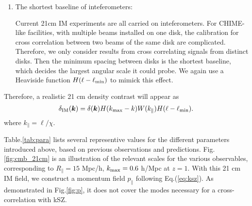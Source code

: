 \begin{enumerate}
\item The shortest baseline of inteferometers:

Current 21cm IM experiments are all carried on inteferometers. 
For CHIME-like facilities, with multiple beams installed on one disk, 
the calibration for cross correlation between two beams of the same disk 
are complicated. 
Therefore, we only consider results from cross correlating signals from distinct disks. 
Then the minimum spacing between disks is the shortest baseline, which decides the largest angular scale it could probe.  We again use a Heaviside function 
$H(\ell-\ell_\mathrm{min})$ to mimick this effect. 
\end{enumerate}
Therefore, a realistic 21 cm density contrast will appear as 
\begin{eqnarray}
\label{eq:ns}
    \delta_\mathrm{IM}(\bm{k})=\delta(\bm{k})H(k_\mathrm{max}-k)W(k_\parallel)H(\ell-\ell_\mathrm{min}).
\end{eqnarray}
where $k_\parallel = \ell / \chi$. 

Table.\ref{tab:para} lists several representive values for the different parameters introduced above, based on previous observations and predictions. Fig. \ref{fig:cmb_21cm} is an illustration of the relevant scales for the various observables, corresponding to $R_\parallel=15$ Mpc/h, $k_\mathrm{max}=0.6$ h/Mpc at $z=1$. With this 21 cm IM field, we construct a momentum field $p_\parallel$ following Eq.(\ref{eq:ksz}). As demonstrated in Fig.\ref{fig:p}, it does not cover the modes necessary for a cross-correlation with kSZ.

